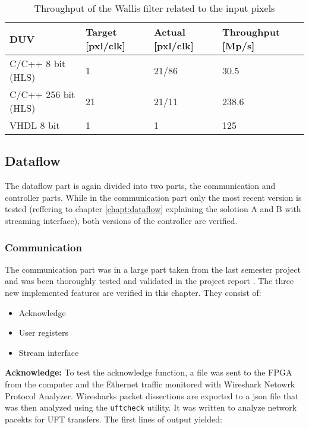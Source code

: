 \begin{table}[tb!]
    \centering
    \begin{tabular}{l l l l}
        \toprule
        DUV & Target [pxl/clk] & Actual [pxl/clk]  & Throughput [Mp/s]\\
        \midrule
        C/C++ 8 bit (HLS) & 1 & 21/86 & 30.5\\
        C/C++ 256 bit (HLS) & 21 & 21/11 & 238.6 \\
        VHDL 8 bit & 1 & 1 & 125 \\
        \bottomrule
    \end{tabular}
    \caption{Throughput of the Wallis filter related to the input pixels}
    \label{tab:throughput}
\end{table}

%
%
\subsection{Dataflow}\label{ch:verification:dataflow}
The dataflow part is again divided into two parts, the communication and
controller parts. While in the communication part only the most recent version
is tested (reffering to chapter \ref{chapt:dataflow} explaining the solotion
A and B with streaming interface), both versions of the controller are verified.

\subsubsection*{Communication}
The communication part was in a large part taken from the last semester project
and was been thoroughly tested and validated in the project report 
\cite{p5report}. The three new implemented features are verified in this
chapter. They consist of:
\begin{itemize}
    \item Acknowledge
    \item User registers
    \item Stream interface
\end{itemize}

\vspace{1ex}
\textbf{Acknowledge:} To test the acknowledge function, a file was sent to the
FPGA from the computer
and the Ethernet traffic monitored with Wireshark Netowrk Protocol Analyzer.
Wiresharks packet dissections are exported to a json file that was then analyzed
using the \texttt{uftcheck} utility. It was written to analyze network pacekts
for UFT transfers. The first lines of output yielded:

